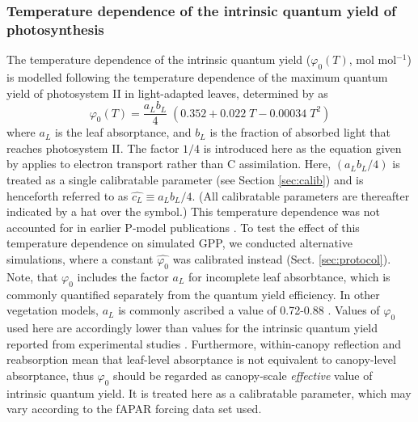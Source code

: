 \documentclass[gmd, manuscript]{copernicus}
\begin{document}
\subsubsection{Temperature dependence of the intrinsic quantum yield of photosynthesis}
\label{sec:tempstress}
The temperature dependence of the intrinsic quantum yield ($\varphi_0(T)$, mol mol$^{-1}$) is modelled following the temperature dependence of the maximum quantum yield of photosystem II in light-adapted leaves, determined by \citet{bernacchi03pce} as 
\begin{equation}
\label{eq:bernacchi03}
\varphi_0(T) = \frac{a_L b_L}{4} \; ( 0.352 + 0.022\;T - 0.00034\;T^2 )
\end{equation}
where $a_L$ is the leaf absorptance, and $b_L$ is the fraction of absorbed light that reaches photosystem II. The factor $1/4$ is introduced here as the equation given by \citet{bernacchi03pce} applies to electron transport rather than C assimilation. Here, $(a_L b_L / 4)$ is treated as a single calibratable parameter (see Section \ref{sec:calib}) and is henceforth referred to as $\widehat{c_L}\equiv a_L b_L / 4$. (All calibratable parameters are thereafter indicated by a hat over the symbol.) This temperature dependence was not accounted for in earlier P-model publications \citep{keenan17natcomm, wang17natpl}. To test the effect of this temperature dependence on simulated GPP, we conducted alternative simulations, where a constant $\widehat{\varphi_0}$ was calibrated instead (Sect. \ref{sec:protocol}). Note, that $\varphi_0$ includes the factor $a_L$ for incomplete leaf absorbtance, which is commonly quantified separately from the quantum yield efficiency. In other vegetation models, $a_L$ is commonly ascribed a value of 0.72-0.88 \citep{rogers17}. Values of $\varphi_0$ used here are accordingly lower than values for the intrinsic quantum yield reported from experimental studies \citep{long93, singsaas01}. Furthermore, within-canopy reflection and reabsorption mean that leaf-level absorptance is not equivalent to canopy-level absorptance, thus $\varphi_0$ should be regarded as canopy-scale \textit{effective} value of intrinsic quantum yield. It is treated here as a calibratable parameter, which may vary according to the fAPAR forcing data set used. 
\end{document}

